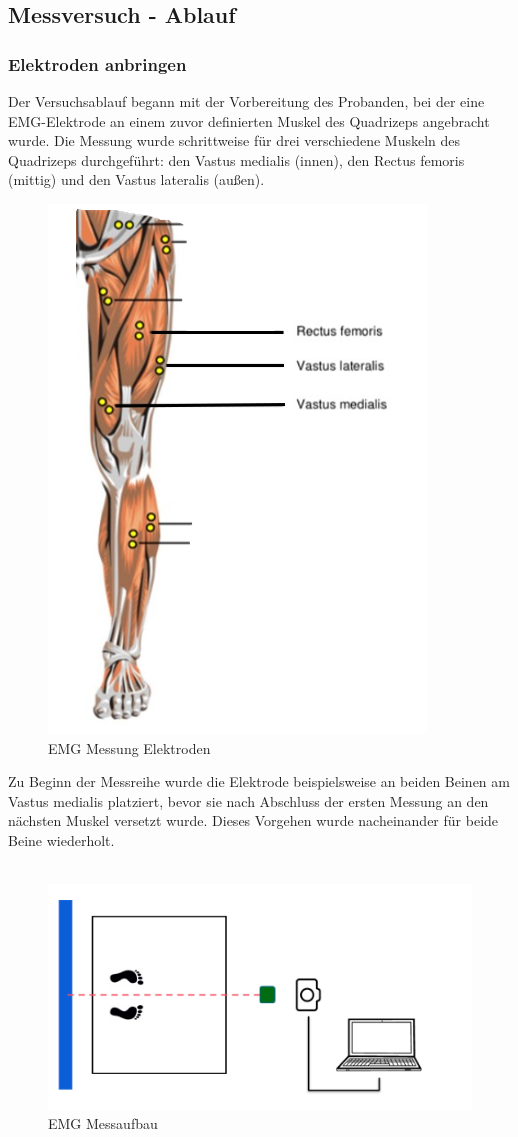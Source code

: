 \subsection{Messversuch - Ablauf}

\subsubsection{Elektroden anbringen}

Der Versuchsablauf begann mit der Vorbereitung des Probanden, bei der eine EMG-Elektrode an einem zuvor definierten Muskel des Quadrizeps angebracht wurde. Die Messung wurde schrittweise für drei verschiedene Muskeln des Quadrizeps durchgeführt: den Vastus medialis (innen), den Rectus femoris (mittig) und den Vastus lateralis (außen). 

\begin{figure}
    \centering
    \includegraphics[width=0.5\linewidth]{img/EMG Muskeln.png}
    \caption{EMG Messung Elektroden}
    \label{EMG Messung Elektroden}
\end{figure}

Zu Beginn der Messreihe wurde die Elektrode beispielsweise an beiden Beinen am Vastus medialis platziert, bevor sie nach Abschluss der ersten Messung an den nächsten Muskel versetzt wurde. Dieses Vorgehen wurde nacheinander für beide Beine wiederholt.\\
\\
\begin{figure}
    \centering
    \includegraphics[width=0.8\linewidth]{img/Aufbau EMG.png}
    \caption{EMG Messaufbau }
    \label{EMG Messaufbau}
\end{figure}

